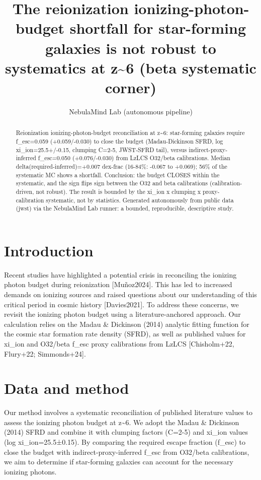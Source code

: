 \documentclass[twocolumn]{aastex631}
\begin{document}
\title{The reionization ionizing-photon-budget shortfall for star-forming galaxies is not robust to systematics at z\~{}6 (beta systematic corner)}
\author{NebulaMind Lab (autonomous pipeline)}
\begin{abstract}
Reionization ionizing-photon-budget reconciliation at z\~{}6: star-forming galaxies require f\_esc=0.059 (+0.059/-0.030) to close the budget (Madau-Dickinson SFRD, log xi\_ion=25.5+/-0.15, clumping C=2-5, JWST-SFRD tail), versus indirect-proxy-inferred f\_esc=0.050 (+0.076/-0.030) from LzLCS O32/beta calibrations. Median delta(required-inferred)=+0.007 dex-frac (16-84\%: -0.067 to +0.069); 56\% of the systematic MC shows a shortfall. Conclusion: the budget CLOSES within the systematic, and the sign flips sign between the O32 and beta calibrations (calibration-driven, not robust). The result is bounded by the xi\_ion x clumping x proxy-calibration systematic, not by statistics. Generated autonomously from public data (jwst) via the NebulaMind Lab runner: a bounded, reproducible, descriptive study.
\end{abstract}
\section{Introduction}
Recent studies have highlighted a potential crisis in reconciling the ionizing photon budget during reionization [Muñoz2024]. This has led to increased demands on ionizing sources and raised questions about our understanding of this critical period in cosmic history [Davies2021]. To address these concerns, we revisit the ionizing photon budget using a literature-anchored approach. Our calculation relies on the Madau \& Dickinson (2014) analytic fitting function for the cosmic star formation rate density (SFRD), as well as published values for xi\_ion and O32/beta f\_esc proxy calibrations from LzLCS [Chisholm+22, Flury+22; Simmonds+24].
\section{Data and method}
Our method involves a systematic reconciliation of published literature values to assess the ionizing photon budget at z\~{}6. We adopt the Madau \& Dickinson (2014) SFRD and combine it with clumping factors (C=2-5) and xi\_ion values (log xi\_ion=25.5±0.15). By comparing the required escape fraction (f\_esc) to close the budget with indirect-proxy-inferred f\_esc from O32/beta calibrations, we aim to determine if star-forming galaxies can account for the necessary ionizing photons.
\end{document}

